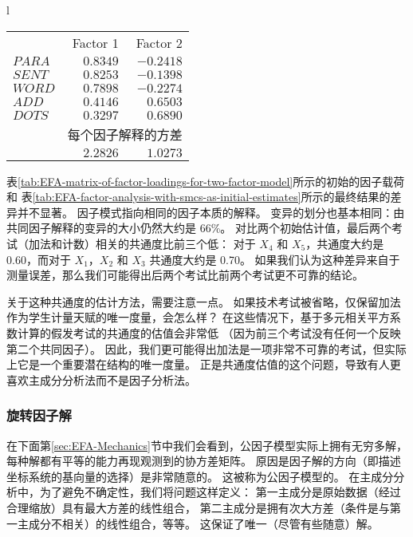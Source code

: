 \begin{table}[htb]
{\begin{tabular}{l}
\begin{minipage}{0.5\textwidth}
\begin{tabular}{lrr}
                    & Factor 1 & Factor 2 \\ 
                    $ PARA $ & $0.8349$ & $-0.2418$ \\
                    $ SENT $ & $0.8253$ & $-0.1398$ \\
                    $ WORD $ & $0.7898$ & $-0.2274$ \\
                    $ ADD  $ & $0.4146$ & $ 0.6503$ \\
                    $ DOTS $ & $0.3297$ & $ 0.6890$ \\
                    & \multicolumn{2}{c}{每个因子解释的方差} \\
                    & $2.2826$ & $1.0273$ \\ 
                \end{tabular}
            \end{minipage}
        \end{tabular}
    }
\end{table}

表\ref{tab:EFA-matrix-of-factor-loadings-for-two-factor-model}所示的初始的因子载荷和
表\ref{tab:EFA-factor-analysis-with-smcs-as-initial-estimates}所示的最终结果的差异并不显著。
因子模式指向相同的因子本质的解释。
变异的划分也基本相同：由共同因子解释的变异的大小仍然大约是 66\%。
对比两个初始估计值，最后两个考试（加法和计数）相关的共通度比前三个低：
对于 $ X_4 $ 和 $ X_5 $，共通度大约是 0.60，而对于 $ X_1 $，$ X_2 $ 和 $ X_3 $ 共通度大约是 0.70。
如果我们认为这种差异来自于测量误差，那么我们可能得出后两个考试比前两个考试更不可靠的结论。

关于这种共通度的估计方法，需要注意一点。
如果技术考试被省略，仅保留加法作为学生计量天赋的唯一度量，会怎么样？
在这些情况下，基于多元相关平方系数计算的假发考试的共通度的估值会非常低
（因为前三个考试没有任何一个反映第二个共同因子）。
因此，我们更可能得出加法是一项非常不可靠的考试，但实际上它是一个重要潜在结构的唯一度量。
正是共通度估值的这个问题，导致有人更喜欢主成分分析法而不是因子分析法。

\subsubsection{旋转因子解}

在下面第\ref{sec:EFA-Mechanics}节中我们会看到，公因子模型实际上拥有无穷多解，
每种解都有平等的能力再现观测到的协方差矩阵。
原因是因子解的方向（即描述坐标系统的基向量的选择）是非常随意的。
这被称为公因子模型的。
在主成分分析中，为了避免不确定性，我们将问题这样定义：
第一主成分是原始数据（经过合理缩放）具有最大方差的线性组合，
第二主成分是拥有次大方差（条件是与第一主成分不相关）的线性组合，等等。
这保证了唯一（尽管有些随意）解。

